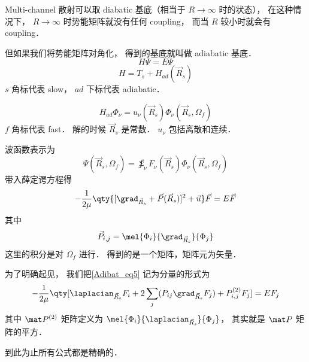 
Multi-channel 散射可以取 diabatic 基底（相当于 $R\to \infty$ 时的状态）， 在这种情况下， $R\to\infty$ 时势能矩阵就没有任何 coupling， 而当 $R$ 较小时就会有 coupling．

但如果我们将势能矩阵对角化， 得到的基底就叫做 adiabatic 基底．
\begin{equation}
H \Psi = E \Psi
\end{equation}
\begin{equation}
H = T_s + H_{ad}(\vec R_s)
\end{equation}
$s$ 角标代表 slow， $ad$ 下标代表 adiabatic．

\begin{equation}
H_{ad} \Phi_\nu = u_\nu (\vec R_s) \Phi_\nu (\vec R_s, \Omega_f)
\end{equation}
$f$ 角标代表 fast． 解的时候 $\vec R_s$ 是常数． $u_\nu$ 包括离散和连续．

波函数表示为
\begin{equation}
\Psi(\vec R_s, \Omega_f) = \sumint_\nu F_\nu (\vec R_s) \Phi_\nu(\vec R_s, \Omega_f)
\end{equation}
带入薛定谔方程得
\begin{equation}\label{Adibat_eq5}
-\frac{1}{2\mu} \qty{[\grad_{\vec R_s} + \vec P(\vec R_s)]^2 + \vec u} \vec F = E \vec F
\end{equation}
其中
\begin{equation}
\vec P_{i,j} = \mel{\Phi_i}{\grad_{\vec R_s}}{\Phi_j}
\end{equation}
这里的积分是对 $\Omega_f$ 进行． 得到的是一个矩阵，矩阵元为矢量．

为了明确起见， 我们把\autoref{Adibat_eq5} 记为分量的形式为
\begin{equation}
-\frac{1}{2\mu} \qty[\laplacian_{\vec R_s} F_i + 2\sum_j ( P_{ij} \grad_{\vec R_s} F_j) + P_{i,j}^{(2)} F_j] = E F_j
\end{equation}
其中 $\mat P^{(2)}$ 矩阵定义为 $\mel{\Phi_i}{\laplacian_{\vec R_s}}{\Phi_j}$， 其实就是 $\mat P$ 矩阵的平方．

到此为止所有公式都是精确的．
